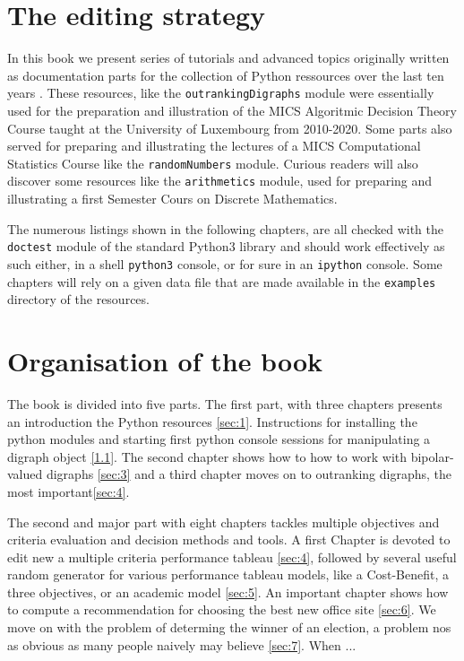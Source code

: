 \label{sec:0}



\section{The editing strategy}

In this book we present series of tutorials and advanced topics originally written as documentation parts for the \Digraph collection of Python ressources over the last ten years \citep{BIS-2021}. These \Digraph resources, like the \texttt{outrankingDigraphs} module were essentially used for the preparation and illustration of the MICS Algoritmic Decision Theory Course taught at the University of Luxembourg from 2010-2020. Some parts also served for preparing and illustrating the lectures of a MICS Computational Statistics Course like the \texttt{randomNumbers} module. Curious readers will also discover some resources like the \texttt{arithmetics} module, used for preparing and illustrating a first Semester Cours on Discrete Mathematics.

The numerous listings shown in the following chapters, are all checked with the \texttt{doctest} module of the standard Python3 library and should work effectively as such either, in a shell \texttt{python3} console, or for sure in an \texttt{ipython} console. Some chapters will rely on a given data file that are made available in the \texttt{examples} directory of the \Digraph resources. 



\section{Organisation of the book}
The book is divided into five parts. The first part, with three chapters presents an introduction the \Digraph Python resources \ref{sec:1}. Instructions for installing the python modules and starting first python console sessions for manipulating a digraph object \ref{1.1}. The second chapter shows how to how to work with bipolar-valued digraphs \ref{sec:3} and a third chapter moves on to outranking digraphs, the most important\ref{sec:4}.

The second and major part with eight chapters tackles multiple objectives and criteria evaluation and decision methods and tools. A first Chapter is devoted to edit new a multiple criteria performance tableau \ref{sec:4}, followed by several useful random generator for various performance tableau models, like a Cost-Benefit, a three objectives, or an academic model \ref{sec:5}. An important chapter shows how to compute a recommendation for choosing the best new office site \ref{sec:6}. We move on with the problem of determing the winner of an election, a problem nos as obvious as many people naively may believe \ref{sec:7}. When ...

